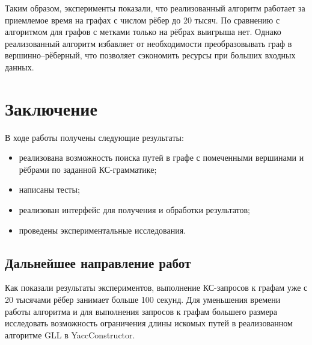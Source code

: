 \documentclass[14pt]{matmex-diploma}
\begin{document}
Таким образом, эксперименты показали, что реализованный алгоритм работает за приемлемое время на графах с числом рёбер до 20 тысяч. По сравнению с алгоритмом для графов с метками только на рёбрах выигрыша нет. Однако реализованный алгоритм избавляет от необходимости преобразовывать граф в вершинно--рёберный, что позволяет сэкономить ресурсы при больших входных данных.

\section{Заключение}
В ходе работы получены следующие результаты:
\begin{itemize}
    \item реализована возможность поиска путей в графе с помеченными вершинами и рёбрами по заданной КС-грамматике;
    \item написаны тесты;
    \item реализован интерфейс для получения и обработки результатов;
    \item проведены экспериментальные исследования.
\end{itemize}

\subsection{Дальнейшее направление работ}

Как показали результаты экспериментов, выполнение КС-запросов к графам уже с 20 тысячами рёбер занимает больше 100 секунд. Для уменьшения времени работы алгоритма и для выполнения запросов к графам большего размера исследовать возможность ограничения длины искомых путей в реализованном алгоритме GLL в YaccConstructor.

\setmonofont[Mapping=tex-text]{CMU Typewriter Text}


\end{document}
